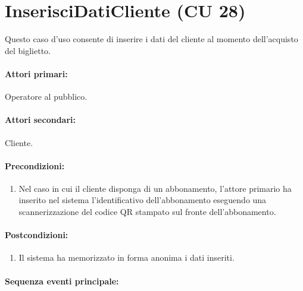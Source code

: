 \documentclass{article}
\begin{document}
\newpage

\section*{InserisciDatiCliente (CU 28)}
	
\indent\indent Questo caso d'uso consente di inserire i dati del cliente al momento dell'acquisto del biglietto.
	
	\paragraph{Attori primari:}Operatore al pubblico.
	
	\paragraph{Attori secondari:}Cliente.
	
	\paragraph{Precondizioni:}
	\begin{enumerate}[itemsep=8pt,parsep=0pt]
		\item Nel caso in cui il cliente disponga di un abbonamento, l'attore primario ha inserito nel sistema l'identificativo dell'abbonamento eseguendo una scannerizzazione del codice QR stampato sul fronte dell'abbonamento.
	\end{enumerate}

	\paragraph{Postcondizioni:}
	\begin{enumerate}[itemsep=8pt,parsep=0pt]
		\item Il sistema ha memorizzato in forma anonima i dati inseriti.
	\end{enumerate}
	
	\paragraph{Sequenza eventi principale:}
\end{document}
